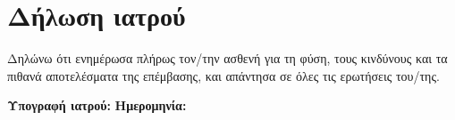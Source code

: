 \documentclass[10pt,greek]{article}
\begin{document}
\section{Δήλωση ιατρού}
Δηλώνω ότι ενημέρωσα πλήρως τον/την ασθενή για τη φύση, τους κινδύνους και τα πιθανά αποτελέσματα της επέμβασης, και απάντησα σε όλες τις ερωτήσεις του/της.

\vspace{1em}
\noindent\textbf{Υπογραφή ιατρού:} \underline{\hspace{6cm}} \hfill \textbf{Ημερομηνία:} \underline{\hspace{3cm}}
\end{document}
